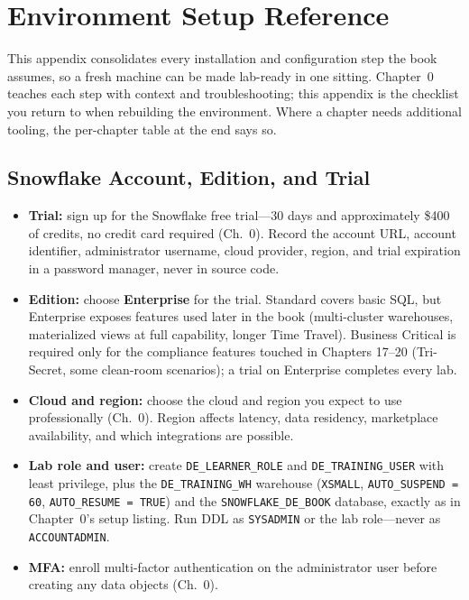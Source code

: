 \chapter{Environment Setup Reference}
%
This appendix consolidates every installation and configuration step the book assumes, so a
fresh machine can be made lab-ready in one sitting. Chapter~0 teaches each step with context
and troubleshooting; this appendix is the checklist you return to when rebuilding the
environment. Where a chapter needs additional tooling, the per-chapter table at the end says so.

\section{Snowflake Account, Edition, and Trial}
\begin{itemize}
    \item \textbf{Trial:} sign up for the Snowflake free trial---30 days and approximately
    \$400 of credits, no credit card required (Ch.~0). Record the account URL, account
    identifier, administrator username, cloud provider, region, and trial expiration in a
    password manager, never in source code.
    \item \textbf{Edition:} choose \textbf{Enterprise} for the trial. Standard covers basic SQL,
    but Enterprise exposes features used later in the book (multi-cluster warehouses,
    materialized views at full capability, longer Time Travel). Business Critical is required
    only for the compliance features touched in Chapters 17--20 (Tri-Secret, some clean-room
    scenarios); a trial on Enterprise completes every lab.
    \item \textbf{Cloud and region:} choose the cloud and region you expect to use
    professionally (Ch.~0). Region affects latency, data residency, marketplace availability,
    and which integrations are possible.
    \item \textbf{Lab role and user:} create \texttt{DE\_LEARNER\_ROLE} and
    \texttt{DE\_TRAINING\_USER} with least privilege, plus the \texttt{DE\_TRAINING\_WH}
    warehouse (\texttt{XSMALL}, \texttt{AUTO\_SUSPEND = 60}, \texttt{AUTO\_RESUME = TRUE}) and
    the \texttt{SNOWFLAKE\_DE\_BOOK} database, exactly as in Chapter~0's setup listing. Run DDL
    as \texttt{SYSADMIN} or the lab role---never as \texttt{ACCOUNTADMIN}.
    \item \textbf{MFA:} enroll multi-factor authentication on the administrator user before
    creating any data objects (Ch.~0).
\end{itemize}

